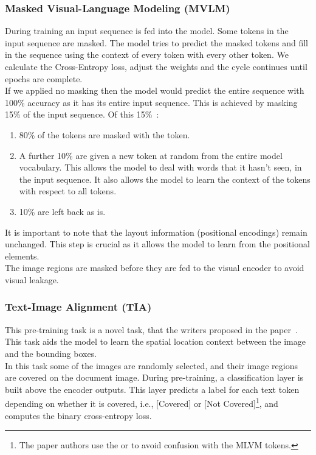 \subsubsection{Masked Visual-Language Modeling (MVLM)}
During training an input sequence is fed into the model. Some tokens in the input sequence are masked. The model tries
to predict the masked tokens and fill in the sequence using the context of every token with every other token. We
calculate the Cross-Entropy loss, adjust the weights and the cycle continues until epochs are complete.\\
If we applied no masking then the model would predict the entire sequence with 100\% accuracy as it has its entire input sequence.
\bigbreak
This is achieved by masking 15\% of the input sequence. Of this 15\%~\autocite{devlinBERTPretrainingDeep2019}:
\begin{enumerate}
	\item 80\% of the tokens are masked with the \code{[MASK]} token.
	\item A further 10\% are given a new token at random from the entire model vocabulary. This allows the model to deal
	      with words that it hasn't seen, in the input sequence. It also allows the model to learn the context of the tokens with
	      respect to all tokens.
	\item 10\% are left back as is.
\end{enumerate}
It is important to note that the layout information (positional encodings) remain unchanged. This step is crucial
as it allows the model to learn from the positional elements.\\
The image regions are masked before they are fed to the visual encoder to avoid visual leakage.
\subsubsection{Text-Image Alignment (TIA)}
This pre-training task is a novel task, that the writers proposed in the paper~\autocite{xuLayoutLMv2MultimodalPretraining2022}.
This task aids the model to learn the spatial location context between the image and the bounding boxes.\\
In this task some of the images are randomly selected, and their image regions are covered on the document image.
During pre-training, a classification layer is built above the encoder outputs. This layer predicts a label for
each text token depending on whether it is covered, i.e., [Covered] or [Not Covered]\footnote{The paper authors use
	the \code{[Covered]} or  to avoid confusion with the MLVM \code{[MASK]} tokens.}, and
computes the binary cross-entropy loss.
